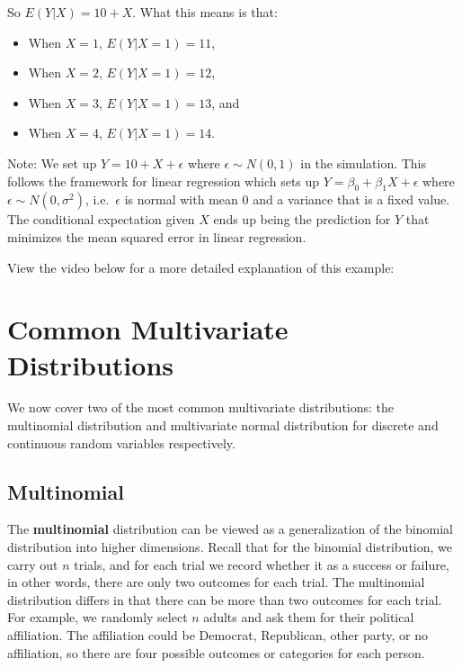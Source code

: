 \documentclass[
]{book}
\providecommand{\tightlist}{%
  \setlength{\itemsep}{0pt}\setlength{\parskip}{0pt}}
\begin{document}
So \(E(Y|X) = 10 + X\). What this means is that:

\begin{itemize}
\tightlist
\item
  When \(X=1\), \(E(Y|X=1) = 11\),
\item
  When \(X=2\), \(E(Y|X=1) = 12\),
\item
  When \(X=3\), \(E(Y|X=1) = 13\), and
\item
  When \(X=4\), \(E(Y|X=1) = 14\).
\end{itemize}

Note: We set up \(Y = 10 + X + \epsilon\) where \(\epsilon \sim N(0,1)\) in the simulation. This follows the framework for linear regression which sets up \(Y = \beta_0 + \beta_1 X + \epsilon\) where \(\epsilon \sim N(0,\sigma^2)\), i.e.~\(\epsilon\) is normal with mean 0 and a variance that is a fixed value. The conditional expectation given \(X\) ends up being the prediction for \(Y\) that minimizes the mean squared error in linear regression.

View the video below for a more detailed explanation of this example:

\hypertarget{commMultDist}{%
\section{Common Multivariate Distributions}\label{commMultDist}}

We now cover two of the most common multivariate distributions: the multinomial distribution and multivariate normal distribution for discrete and continuous random variables respectively.

\hypertarget{multinomial}{%
\subsection{Multinomial}\label{multinomial}}

The \textbf{multinomial} distribution can be viewed as a generalization of the binomial distribution into higher dimensions. Recall that for the binomial distribution, we carry out \(n\) trials, and for each trial we record whether it as a success or failure, in other words, there are only two outcomes for each trial. The multinomial distribution differs in that there can be more than two outcomes for each trial. For example, we randomly select \(n\) adults and ask them for their political affiliation. The affiliation could be Democrat, Republican, other party, or no affiliation, so there are four possible outcomes or categories for each person.
\end{document}
